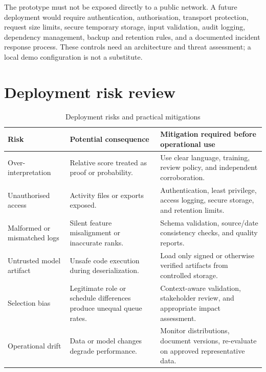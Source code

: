 The prototype must not be exposed directly to a public network. A
future deployment would require authentication, authorisation,
transport protection, request size limits, secure temporary storage,
input validation, audit logging, dependency management, backup and
retention rules, and a documented incident response process. These
controls need an architecture and threat assessment; a local demo
configuration is not a substitute.

\section{Deployment risk review}
\begin{table}[H]
\centering
\tablefont
\caption{Deployment risks and practical mitigations}
\label{tab:deployment-risks}
\begin{tabularx}{\textwidth}{|p{}|p{}|Y|}
\hline
\textbf{Risk} & \textbf{Potential consequence} & \textbf{Mitigation required before operational use}\\\hline
Over-interpretation & Relative score treated as proof or probability. & Use clear language, training, review policy, and independent corroboration.\\\hline
Unauthorised access & Activity files or exports exposed. & Authentication, least privilege, access logging, secure storage, and retention limits.\\\hline
Malformed or mismatched logs & Silent feature misalignment or inaccurate ranks. & Schema validation, source/date consistency checks, and quality reports.\\\hline
Untrusted model artifact & Unsafe code execution during deserialization. & Load only signed or otherwise verified artifacts from controlled storage.\\\hline
Selection bias & Legitimate role or schedule differences produce unequal queue rates. & Context-aware validation, stakeholder review, and appropriate impact assessment.\\\hline
Operational drift & Data or model changes degrade performance. & Monitor distributions, document versions, re-evaluate on approved representative data.\\\hline
\end{tabularx}
\end{table}
